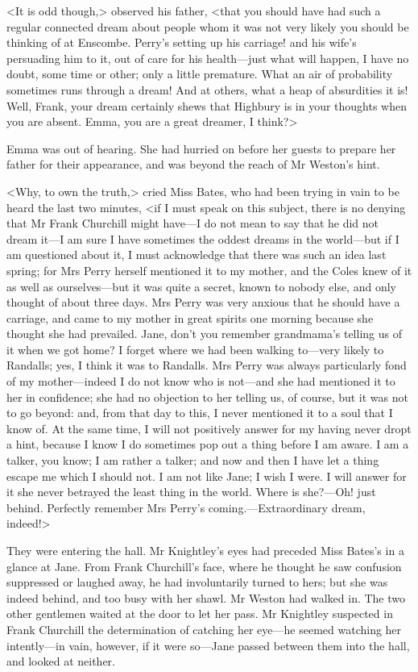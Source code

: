 <It is odd though,> observed his father, <that you should have had such a regular connected dream about people whom it was not very likely you should be thinking of at Enscombe. Perry's setting up his carriage! and his wife's persuading him to it, out of care for his health—just what will happen, I have no doubt, some time or other; only a little premature. What an air of probability sometimes runs through a dream! And at others, what a heap of absurdities it is! Well, Frank, your dream certainly shews that Highbury is in your thoughts when you are absent. Emma, you are a great dreamer, I think?>

Emma was out of hearing. She had hurried on before her guests to prepare her father for their appearance, and was beyond the reach of Mr Weston's hint.

<Why, to own the truth,> cried Miss Bates, who had been trying in vain to be heard the last two minutes, <if I must speak on this subject, there is no denying that Mr Frank Churchill might have—I do not mean to say that he did not dream it—I am sure I have sometimes the oddest dreams in the world—but if I am questioned about it, I must acknowledge that there was such an idea last spring; for Mrs Perry herself mentioned it to my mother, and the Coles knew of it as well as ourselves—but it was quite a secret, known to nobody else, and only thought of about three days. Mrs Perry was very anxious that he should have a carriage, and came to my mother in great spirits one morning because she thought she had prevailed. Jane, don't you remember grandmama's telling us of it when we got home? I forget where we had been walking to—very likely to Randalls; yes, I think it was to Randalls. Mrs Perry was always particularly fond of my mother—indeed I do not know who is not—and she had mentioned it to her in confidence; she had no objection to her telling us, of course, but it was not to go beyond: and, from that day to this, I never mentioned it to a soul that I know of. At the same time, I will not positively answer for my having never dropt a hint, because I know I do sometimes pop out a thing before I am aware. I am a talker, you know; I am rather a talker; and now and then I have let a thing escape me which I should not. I am not like Jane; I wish I were. I will answer for it she never betrayed the least thing in the world. Where is she?—Oh! just behind. Perfectly remember Mrs Perry's coming.—Extraordinary dream, indeed!>

They were entering the hall. Mr Knightley's eyes had preceded Miss Bates's in a glance at Jane. From Frank Churchill's face, where he thought he saw confusion suppressed or laughed away, he had involuntarily turned to hers; but she was indeed behind, and too busy with her shawl. Mr Weston had walked in. The two other gentlemen waited at the door to let her pass. Mr Knightley suspected in Frank Churchill the determination of catching her eye—he seemed watching her intently—in vain, however, if it were so—Jane passed between them into the hall, and looked at neither.

